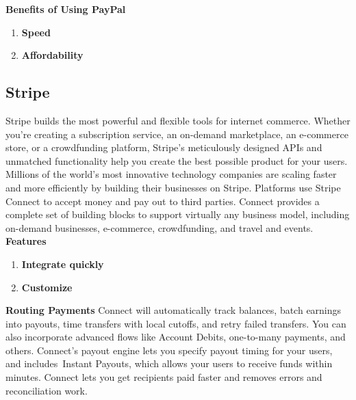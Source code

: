 \textbf{Benefits of Using PayPal}
\begin{enumerate}
  \item {\textbf{Speed}} 
  \item {\textbf{Affordability}}  
\end{enumerate}
\subsection{Stripe}
\hspace{2cm} Stripe builds the most powerful and flexible tools for internet commerce. Whether you’re creating a subscription service, an on-demand marketplace, an e-commerce store, or a crowdfunding platform, Stripe’s meticulously designed APIs and unmatched functionality help you create the best possible product for your users. Millions of the world’s most innovative technology companies are scaling faster and more efficiently by building their businesses on Stripe. Platforms use Stripe Connect to accept money and pay out to third parties. Connect provides a complete set of building blocks to support virtually any business model, including on-demand businesses, e-commerce, crowdfunding, and travel and events.  \cite{ha006} \newline \newline
\textbf{Features}
\begin{enumerate}
  \item {\textbf{Integrate quickly}} 
  \item {\textbf{Customize}}  
   \newline
\end{enumerate}
\textbf{Routing Payments} \newline
Connect will automatically track balances, batch earnings into payouts, time transfers with local cutoffs, and retry failed transfers. You can also incorporate advanced flows like Account Debits, one-to-many payments, and others. Connect’s payout engine lets you specify payout timing for your users, and includes Instant Payouts, which allows your users to receive funds within minutes. Connect lets you get recipients paid faster and removes errors and reconciliation work.

